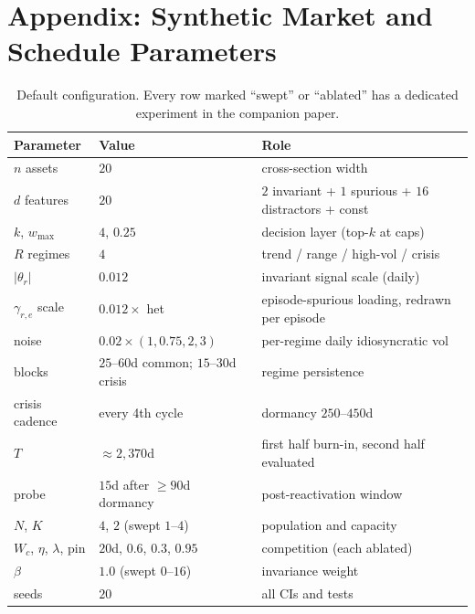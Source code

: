 \documentclass[10pt]{article}
\begin{document}
\section{Appendix: Synthetic Market and Schedule Parameters}
\label{app:params}

\begin{table}[h]
\centering
\small
\begin{tabular}{llp{6.6cm}}
\toprule
\textbf{Parameter} & \textbf{Value} & \textbf{Role} \\
\midrule
$n$ assets & $20$ & cross-section width \\
$d$ features & $20$ & $2$ invariant + $1$ spurious + $16$ distractors + const \\
$k$, $w_{\max}$ & $4$, $0.25$ & decision layer (top-$k$ at caps) \\
$R$ regimes & $4$ & trend / range / high-vol / crisis \\
$|\theta_r|$ & $0.012$ & invariant signal scale (daily) \\
$\gamma_{r,e}$ scale & $0.012 \times$ het & episode-spurious loading, redrawn per episode \\
noise & $0.02 \times (1, 0.75, 2, 3)$ & per-regime daily idiosyncratic vol \\
blocks & $25$--$60$d common; $15$--$30$d crisis & regime persistence \\
crisis cadence & every 4th cycle & dormancy $250$--$450$d \\
$T$ & $\approx 2{,}370$d & first half burn-in, second half evaluated \\
probe & $15$d after $\ge 90$d dormancy & post-reactivation window \\
$N$, $K$ & $4$, $2$ (swept $1$--$4$) & population and capacity \\
$W_c$, $\eta$, $\lambda$, pin & $20$d, $0.6$, $0.3$, $0.95$ & competition (each ablated) \\
$\beta$ & $1.0$ (swept $0$--$16$) & invariance weight \\
seeds & $20$ & all CIs and tests \\
\bottomrule
\end{tabular}
\caption{Default configuration. Every row marked ``swept'' or
``ablated'' has a dedicated experiment in the companion paper.}
\label{tab:params}
\end{table}
\end{document}
